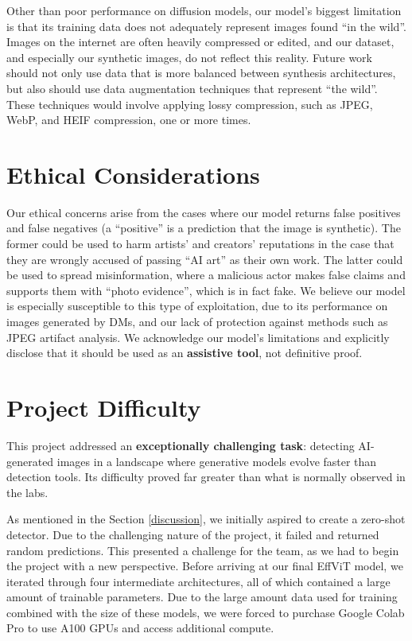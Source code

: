 \documentclass{article} %
\begin{document}
Other than poor performance on diffusion models, our model's biggest limitation is that its training data does not adequately represent images found ``in the wild''. Images on the internet are often heavily compressed or edited, and our dataset, and especially our synthetic images, do not reflect this reality. Future work should not only use data that is more balanced between synthesis architectures, but also should use data augmentation techniques that represent ``the wild''. These techniques would involve applying lossy compression, such as JPEG, WebP, and HEIF compression, one or more times.

\section{Ethical Considerations}

Our ethical concerns arise from the cases where our model returns false positives and false negatives (a ``positive'' is a prediction that the image is synthetic). The former could be used to harm artists' and creators' reputations in the case that they are wrongly accused of passing ``AI art'' as their own work. The latter could be used to spread misinformation, where a malicious actor makes false claims and supports them with ``photo evidence'', which is in fact fake. We believe our model is especially susceptible to this type of exploitation, due to its performance on images generated by DMs, and our lack of protection against methods such as JPEG artifact analysis. We acknowledge our model's limitations and explicitly disclose that it should be used as an \textbf{assistive tool}, not definitive proof.

\section{Project Difficulty}

This project addressed an \textbf{exceptionally challenging task}: detecting AI-generated images in a landscape where generative models evolve faster than detection tools. Its difficulty proved far greater than what is normally observed in the labs.

As mentioned in the Section \ref{discussion}, we initially aspired to create a zero-shot detector. Due to the challenging nature of the project, it failed and returned random predictions. This presented a challenge for the team, as we had to begin the project with a new perspective. Before arriving at our final EffViT model, we iterated through four intermediate architectures, all of which contained a large amount of trainable parameters. Due to the large amount data used for training combined with the size of these models, we were forced to purchase Google Colab Pro to use A100 GPUs and access additional compute.
\end{document}
